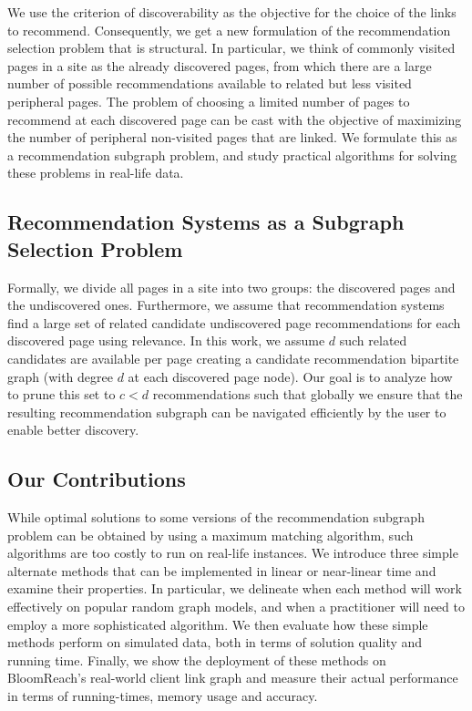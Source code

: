 We use the criterion of discoverability as the objective for the choice of the links to recommend. Consequently, we get a new formulation of the recommendation selection problem that is structural. In particular, we think of commonly visited pages in a site as the already discovered pages, from which there are a large number of possible recommendations available to related but less visited peripheral pages. The problem of choosing a limited number of pages to recommend at each discovered page can be cast with the objective of maximizing the number of peripheral non-visited pages that are linked. We formulate this as a recommendation subgraph problem, and study practical algorithms for solving these problems in real-life data. \vs

\subsection{Recommendation Systems as a Subgraph Selection Problem}

Formally, we divide all pages in a site into two groups: the discovered pages and the undiscovered ones.
Furthermore, we assume that recommendation systems~\cite{Schafer1999, Adomavicius2005,
  Resnick1997} find a large set of related candidate undiscovered page recommendations
for each discovered page using relevance. In this work, we assume $d$
such related candidates are available per page creating a candidate recommendation bipartite graph 
(with degree $d$ at each discovered page node).
Our goal is to analyze how to prune this set to $c < d$ recommendations such that
globally we ensure that the resulting recommendation subgraph can be navigated efficiently by the user to enable better discovery. \vs

\subsection{Our Contributions}
While optimal solutions to some versions of the recommendation subgraph problem can be obtained by using a maximum matching algorithm, such algorithms are too costly to run on real-life instances. We introduce three simple alternate methods that can be implemented in linear or near-linear time and examine their properties. 
In particular, we delineate when
each method will work effectively on popular random graph models, and when a practitioner will need to employ a more sophisticated algorithm. 
We then evaluate how these simple methods perform on simulated data, both in terms of solution quality and  running time.
Finally, we show the deployment of these methods on BloomReach's real-world client link graph and measure their
actual performance in terms of running-times, memory usage and accuracy. \vs

